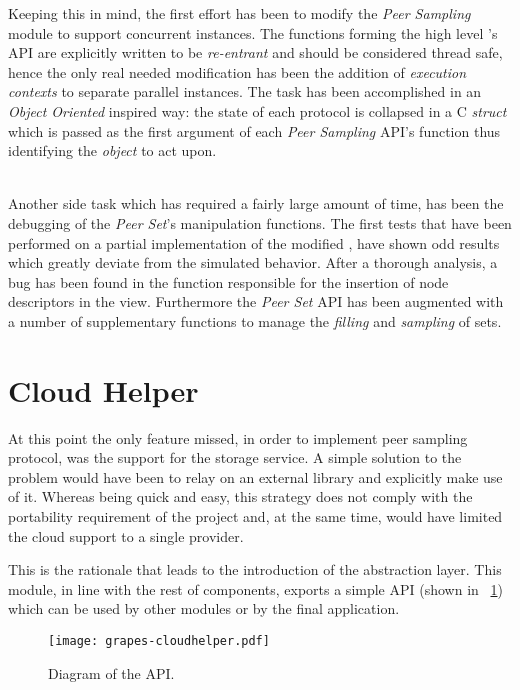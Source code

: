 Keeping this in mind, the first effort has been to modify the
\emph{Peer Sampling} module to support concurrent instances. The
functions forming the high level \grapes's API are explicitly written
to be \emph{re-entrant} and should be considered thread safe, hence the only
real needed modification has been the addition of \textit{execution contexts} to
separate parallel instances. The task has been accomplished in an
\emph{Object Oriented} inspired way: the state of each protocol is
collapsed in a C \emph{struct} which is passed as the first
argument of each \textit{Peer Sampling} API's function thus identifying
the \emph{object} to act upon.

\ \\
Another side task which has required a fairly large amount of time, has
been the debugging of the \textit{Peer Set}'s manipulation functions. The
first tests that have been performed on a partial implementation of
the modified
\cyclon, have shown odd results which greatly deviate from the simulated
behavior. After a thorough analysis, a bug has been found in the function
responsible for the insertion of node descriptors in the view.
Furthermore the \textit{Peer Set} API has been augmented with a number of
supplementary functions to manage the \emph{filling} and
\emph{sampling} of sets.

\section{Cloud Helper}
At this point the only feature \grapes missed, in order to implement
\cloudcast peer sampling protocol, was the support for the storage
service. A simple solution to the problem would have been to
relay on an external library and explicitly make use of it. Whereas
being quick and easy, this strategy does not comply with the
portability requirement of the project and, at the same time, would have
limited the cloud support to a single provider.

This is the rationale that leads to the introduction of the
\cloudhelper abstraction layer. This module, in line with the rest of
\grapes components, exports a simple API (shown in~
\ref{fig:grapes-cloudhelper}) which can be used by other
modules or by the final application.

\begin{figure}[H]
  \centering
  \texttt{[image: grapes-cloudhelper.pdf]}
  \caption{Diagram of the \cloudhelper API.}
  \label{fig:grapes-cloudhelper}
\end{figure}

